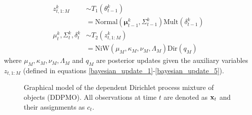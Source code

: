 \documentclass{article}
\begin{document}
\begin{equation}
    \begin{split}
        z_{t,1:M}^k &\sim T_1(\theta_{t-1}^k)\\
            &= \text{Normal}(\boldsymbol{\mu}_{t-1}^k, \Sigma_{t-1}^k) 
            \text{Mult}(\delta_{t-1}^k)\\
        \mu_t^k, \Sigma_t^k, \delta_t^k &\sim  T_2(z_{t,1:M}^k)\\
            &= \text{NiW}(\mu_M,\kappa_M,\nu_M,\Lambda_M) \text{Dir}(q_{M})
    \end{split}
\end{equation}
where $\mu_M,\kappa_M,\nu_M,\Lambda_M$ and $q_{M}$ are posterior updates given the auxiliary variables $z_{t,1:M}$ (defined in equations \ref{bayesian_update_1}-\ref{bayesian_update_5}).
\begin{figure}[h!tbp]
        \caption{\label{fig:gpuddpm_gm_1} Graphical model of the dependent Dirichlet process mixture of objects (DDPMO). All observations at time $t$ are denoted as $\bold{x}_{t}$ and their assignments as $c_{t}$.}
\end{figure}
\end{document}
